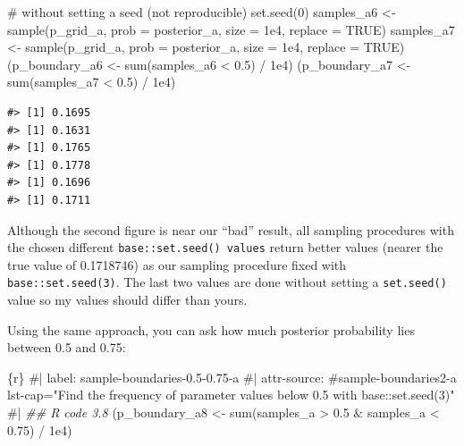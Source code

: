 \documentclass[
  letterpaper,
  DIV=11,
  numbers=noendperiod]{scrreprt}
\newenvironment{Shaded}{\begin{snugshade}}{\end{snugshade}}
\newcommand{\AttributeTok}[1]{\textcolor[rgb]{0.40,0.45,0.13}{#1}}
\newcommand{\CommentTok}[1]{\textcolor[rgb]{0.37,0.37,0.37}{#1}}
\newcommand{\ConstantTok}[1]{\textcolor[rgb]{0.56,0.35,0.01}{#1}}
\newcommand{\DecValTok}[1]{\textcolor[rgb]{0.68,0.00,0.00}{#1}}
\newcommand{\DocumentationTok}[1]{\textcolor[rgb]{0.37,0.37,0.37}{\textit{#1}}}
\newcommand{\FloatTok}[1]{\textcolor[rgb]{0.68,0.00,0.00}{#1}}
\newcommand{\FunctionTok}[1]{\textcolor[rgb]{0.28,0.35,0.67}{#1}}
\newcommand{\InformationTok}[1]{\textcolor[rgb]{0.37,0.37,0.37}{#1}}
\newcommand{\NormalTok}[1]{\textcolor[rgb]{0.00,0.23,0.31}{#1}}
\newcommand{\OtherTok}[1]{\textcolor[rgb]{0.00,0.23,0.31}{#1}}
\newcommand{\SpecialCharTok}[1]{\textcolor[rgb]{0.37,0.37,0.37}{#1}}
\begin{document}
\begin{Shaded}
\begin{Highlighting}[]
\CommentTok{\# without setting a seed (not reproducible)}
\FunctionTok{set.seed}\NormalTok{(}\DecValTok{0}\NormalTok{)}
\NormalTok{samples\_a6 }\OtherTok{\textless{}{-}} \FunctionTok{sample}\NormalTok{(p\_grid\_a, }\AttributeTok{prob =}\NormalTok{ posterior\_a, }\AttributeTok{size =} \FloatTok{1e4}\NormalTok{, }\AttributeTok{replace =} \ConstantTok{TRUE}\NormalTok{)}
\NormalTok{samples\_a7 }\OtherTok{\textless{}{-}} \FunctionTok{sample}\NormalTok{(p\_grid\_a, }\AttributeTok{prob =}\NormalTok{ posterior\_a, }\AttributeTok{size =} \FloatTok{1e4}\NormalTok{, }\AttributeTok{replace =} \ConstantTok{TRUE}\NormalTok{)}
\NormalTok{(p\_boundary\_a6 }\OtherTok{\textless{}{-}} \FunctionTok{sum}\NormalTok{(samples\_a6 }\SpecialCharTok{\textless{}} \FloatTok{0.5}\NormalTok{) }\SpecialCharTok{/} \FloatTok{1e4}\NormalTok{)}
\NormalTok{(p\_boundary\_a7 }\OtherTok{\textless{}{-}} \FunctionTok{sum}\NormalTok{(samples\_a7 }\SpecialCharTok{\textless{}} \FloatTok{0.5}\NormalTok{) }\SpecialCharTok{/} \FloatTok{1e4}\NormalTok{)}
\InformationTok{\textasciigrave{}\textasciigrave{}\textasciigrave{}}
\end{Highlighting}
\end{Shaded}

\begin{verbatim}
#> [1] 0.1695
#> [1] 0.1631
#> [1] 0.1765
#> [1] 0.1778
#> [1] 0.1696
#> [1] 0.1711
\end{verbatim}

Although the second figure is near our ``bad'' result, all sampling
procedures with the chosen different \texttt{base::set.seed()\ values}
return better values (nearer the true value of 0.1718746) as our
sampling procedure fixed with \texttt{base::set.seed(3)}. The last two
values are done without setting a \texttt{set.seed()} value so my values
should differ than yours.

Using the same approach, you can ask how much posterior probability lies
between 0.5 and 0.75:

\hypertarget{sample-boundaries2-a}{%
\label{sample-boundaries2-a}}%
\begin{Shaded}
\begin{Highlighting}[]
\InformationTok{\textasciigrave{}\textasciigrave{}\textasciigrave{}\{r\}}
\CommentTok{\#| label: sample{-}boundaries{-}0.5{-}0.75{-}a}
\CommentTok{\#| attr{-}source: \textquotesingle{}\#sample{-}boundaries2{-}a lst{-}cap="Find the frequency of parameter values below 0.5 with \textasciigrave{}base::set.seed(3)\textasciigrave{}"\textquotesingle{}}
\CommentTok{\#|}
\DocumentationTok{\#\# R code 3.8}
\NormalTok{(p\_boundary\_a8 }\OtherTok{\textless{}{-}} \FunctionTok{sum}\NormalTok{(samples\_a }\SpecialCharTok{\textgreater{}} \FloatTok{0.5} \SpecialCharTok{\&}\NormalTok{ samples\_a }\SpecialCharTok{\textless{}} \FloatTok{0.75}\NormalTok{) }\SpecialCharTok{/} \FloatTok{1e4}\NormalTok{)}
\InformationTok{\textasciigrave{}\textasciigrave{}\textasciigrave{}}
\end{Highlighting}
\end{Shaded}
\end{document}
